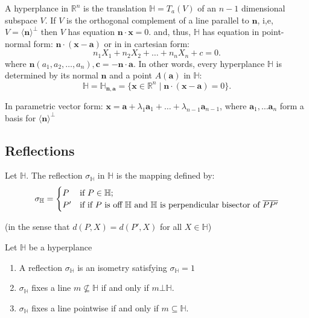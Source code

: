 \begin{definition}
  A hyperplance in \( \mathbb{R}^{n} \) is the translation \(\mathbb{H} = T_{a}(V)\) of an \( n-1 \) dimensional subspace \( V \).
  If \( V \) is the orthogonal complement of a line parallel to \( \mathbf{n} \), i,e, \( V = \langle \mathbf{n}\rangle^{\bot} \) then \( V \) has equation \( \mathbf{n} \cdot \mathbf{x} = 0 \).
  and, thus, \( \mathbb{H} \) has equation in point-normal form: \( \mathbf{n} \cdot \left(\mathbf{x} - \mathbf{a}  \right)\) or in
  in cartesian form:
  \[
    n_{1}X_{1} + n_{2}X_{2} + \ldots + n_{n}X_{n} + c = 0
  .\] 
  where \( \mathbf{n}  \left( a_{1}, a_{2}, \ldots , a_{n} \right), \mathbf{c} = - \mathbf{n} \cdot \mathbf{a}\). In other words, every 
  hyperplance \( \mathbb{H} \) is determined by its normal \( \mathbf{n} \) and a point \( A(\mathbf{a}) \) in \( \mathbb{H} \):
  \[
    \mathbb{H} = \mathbb{H}_{\mathbf{n}, \mathbf{a}} = \{\mathbf{x} \in \mathbb{R}^{n} \mid  \mathbf{n} \cdot(\mathbf{x} - \mathbf{a}) = 0\}
  .\] 

  In parametric vector form: \( \mathbf{x} = \mathbf{a} + \lambda_1\mathbf{a}_1 + \ldots + \lambda_{n-1} \mathbf{a}_{n-1} \), where
  \( \mathbf{a}_1, \ldots \mathbf{a}_n \) form a basis for \( \langle \mathbf{n} \rangle^{\bot} \)
\end{definition}

\subsection{Reflections} 
\begin{definition}
  Let \( \mathbb{H} \). The reflection \( \sigma _{\mathbb{H} } \) in \( \mathbb{H} \) is the mapping defined by:
\begin{equation*}
\sigma_{\mathbb{H}} =
    \begin{cases}
      P   & \text{if  \( P \in \mathbb{H}; \)}  \\
       P'  & \text{if if \( P  \) is off \( \mathbb{H} \) and \( \mathbb{H} \) is perpendicular bisector of \( \overline{PP'} \)} 
    \end{cases}
\end{equation*}

(in the sense that \( d(P, X) = d \left( P', X \right) \) for all \( X \in \mathbb{H}\)) 
\end{definition}

\begin{proposition}
 Let \( \mathbb{H} \)  be a hyperplance
 \begin{enumerate}
   \item A reflection \( \sigma_{\mathbb{H}} \) is an isometry satisfying \( \sigma_{\mathbb{H}} = 1\)
    \item \( \sigma_{\mathbb{H}} \) fixes a line \( m \not \subseteq \mathbb{H} \) if and only if \( m \bot \mathbb{H} \).
    \item \( \sigma_{\mathbb{H}} \) fixes a line pointwise if and only if \( m \subseteq \mathbb{H} \).
 \end{enumerate}

\end{proposition}

